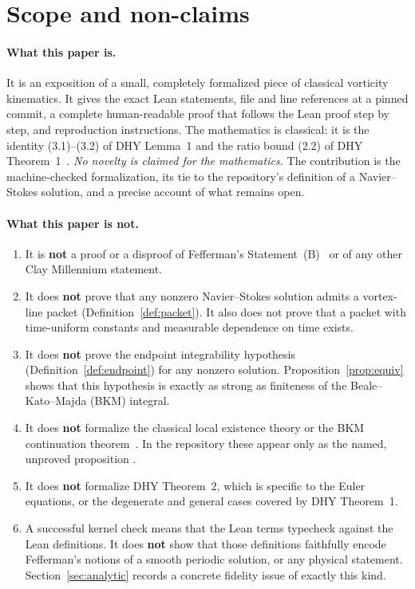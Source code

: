 \documentclass[11pt,a4paper]{article}
\theoremstyle{plain}
\theoremstyle{definition}
\newcommand{\lean}[1]{{\upshape\path{#1}}}
\begin{document}
\tableofcontents

\section{Scope and non-claims}\label{sec:scope}

\paragraph{What this paper is.} It is an exposition of a small, completely
formalized piece of classical vorticity kinematics. It gives the exact Lean
statements, file and line references at a pinned commit, a complete
human-readable proof that follows the Lean proof step by step, and
reproduction instructions. The mathematics is classical: it is the identity
(3.1)--(3.2) of DHY Lemma~1 and the ratio bound (2.2) of DHY
Theorem~1~\cite{DHY2005}. \emph{No novelty is claimed for the mathematics.}
The contribution is the machine-checked formalization, its tie to the
repository's definition of a Navier--Stokes solution, and a precise account of
what remains open.

\paragraph{What this paper is not.}
\begin{enumerate}
  \item It is \textbf{not} a proof or a disproof of Fefferman's Statement~(B)~\cite{Fefferman2006} or of any other Clay Millennium statement.
  \item It does \textbf{not} prove that any nonzero Navier--Stokes solution admits a vortex-line packet (Definition~\ref{def:packet}). It also does not prove that a packet with time-uniform constants and measurable dependence on time exists.
  \item It does \textbf{not} prove the endpoint integrability hypothesis (Definition~\ref{def:endpoint}) for any nonzero solution. Proposition~\ref{prop:equiv} shows that this hypothesis is exactly as strong as finiteness of the Beale--Kato--Majda (BKM) integral.
  \item It does \textbf{not} formalize the classical local existence theory or the BKM continuation theorem~\cite{BKM1984}. In the repository these appear only as the named, unproved proposition \lean{PeriodicMaximalSolutionWithBKM}.
  \item It does \textbf{not} formalize DHY Theorem~2, which is specific to the Euler equations, or the degenerate and general cases covered by DHY Theorem~1.
  \item A successful kernel check means that the Lean terms typecheck against the Lean definitions. It does \textbf{not} show that those definitions faithfully encode Fefferman's notions of a smooth periodic solution, or any physical statement. Section~\ref{sec:analytic} records a concrete fidelity issue of exactly this kind.
\end{enumerate}
\end{document}
